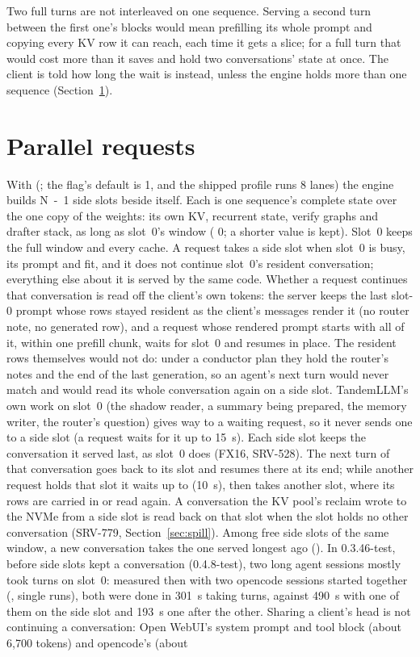 Two full turns are not interleaved on one sequence. Serving a second turn between the first one's blocks would mean prefilling its whole prompt and copying every KV row it can reach, each time it gets a slice; for a full turn that would cost more than it saves and hold two conversations' state at once. The client is told how long the wait is instead, unless the engine holds more than one sequence (Section~\ref{sec:parallel-requests}).

\section{Parallel requests}\label{sec:parallel-requests}

With  (; the flag's default is 1, and the shipped profile runs 8 lanes) the engine builds N~-~1 side slots beside itself. Each is one sequence's complete state over the one copy of the weights: its own KV, recurrent state, verify graphs and drafter stack, as long as slot~0's window ( 0; a shorter value is kept). Slot~0 keeps the full window and every cache. A request takes a side slot when slot~0 is busy, its prompt and  fit, and it does not continue slot~0's resident conversation; everything else about it is served by the same code. Whether a request continues that conversation is read off the client's own tokens: the server keeps the last slot-0 prompt whose rows stayed resident as the client's messages render it (no router note, no generated row), and a request whose rendered prompt starts with all of it, within one prefill chunk, waits for slot~0 and resumes in place. The resident rows themselves would not do: under a conductor plan they hold the router's notes and the end of the last generation, so an agent's next turn would never match and would read its whole conversation again on a side slot. TandemLLM's own work on slot~0 (the shadow reader, a summary being prepared, the memory writer, the router's question) gives way to a waiting request, so it never sends one to a side slot (a request waits for it up to 15~s). Each side slot keeps the conversation it served last, as slot~0 does (FX16, SRV-528). The next turn of that conversation goes back to its slot and resumes there at its end; while another request holds that slot it waits up to  (10~s), then takes another slot, where its rows are carried in or read again. A conversation the KV pool's reclaim wrote to the NVMe from a side slot is read back on that slot when the slot holds no other conversation (SRV-779, Section~\ref{sec:spill}). Among free side slots of the same window, a new conversation takes the one served longest ago (). In 0.3.46-test, before side slots kept a conversation (0.4.8-test), two long agent sessions mostly took turns on slot~0: measured then with two opencode sessions started together (\measured, single runs), both were done in 301~s taking turns, against 490~s with one of them on the side slot and 193~s one after the other. Sharing a client's head is not continuing a conversation: Open WebUI's system prompt and tool block (about 6,700 tokens) and opencode's (about 